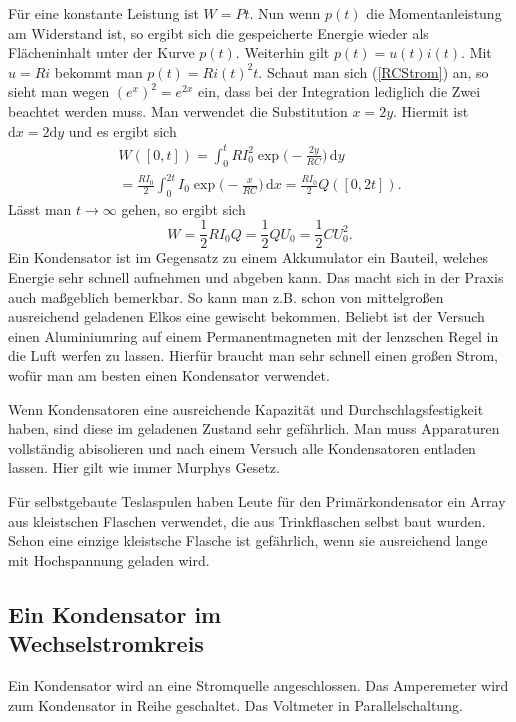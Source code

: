 \documentclass[a4paper,10pt,fleqn,twocolumn,twoside]{article}
\numberwithin{equation}{section}
\begin{document}
Für eine konstante Leistung ist $W=Pt$. Nun wenn $p(t)$ die
Momentanleistung am Widerstand ist, so ergibt sich die gespeicherte
Energie wieder als Flächeninhalt unter der Kurve $p(t)$.
Weiterhin gilt $p(t)=u(t)i(t)$. Mit $u=Ri$ bekommt man
$p(t)=Ri(t)^2 t$. Schaut man sich (\ref{RCStrom}) an, so sieht man
wegen $(e^x)^2=e^{2x}$ ein, dass bei der Integration lediglich
die Zwei beachtet werden muss. Man verwendet die Substitution
$x=2y$. Hiermit ist $\mathrm dx=2\mathrm dy$ und es ergibt sich
\begin{gather*}
W([0,t]) = \int_0^t RI_0^2 \exp\Big(-\frac{2y}{RC}\Big)\,\mathrm dy\\
= \frac{RI_0}{2}\int_0^{2t} I_0 \exp\Big(-\frac{x}{RC}\Big)\,\mathrm dx
= \frac{RI_0}{2}Q([0,2t]).
\end{gather*}
Lässt man $t\rightarrow\infty$ gehen, so ergibt sich
\begin{equation}
W = \frac{1}{2}RI_0Q = \frac{1}{2}QU_0 = \frac{1}{2}CU_0^2.
\end{equation}
Ein Kondensator ist im Gegensatz zu einem Akkumulator ein Bauteil,
welches Energie sehr schnell aufnehmen und abgeben kann. Das macht
sich in der Praxis auch maßgeblich bemerkbar. So kann man z.B. schon
von mittelgroßen ausreichend geladenen Elkos eine gewischt bekommen.
Beliebt ist der Versuch einen Aluminiumring auf einem
Permanentmagneten mit der lenzschen Regel in die Luft werfen zu
lassen. Hierfür braucht man sehr schnell einen großen Strom, wofür
man am besten einen Kondensator verwendet.

Wenn Kondensatoren eine ausreichende Kapazität und
Durchschlagsfestigkeit haben, sind diese im geladenen Zustand
sehr gefährlich. Man muss Apparaturen vollständig abisolieren
und nach einem Versuch alle Kondensatoren entladen lassen.
Hier gilt wie immer Murphys Gesetz.

Für selbstgebaute Teslaspulen haben Leute für den Primärkondensator
ein Array aus kleistschen Flaschen verwendet, die aus Trinkflaschen
selbst baut wurden. Schon eine einzige kleistsche Flasche ist
gefährlich, wenn sie ausreichend lange mit Hochspannung geladen wird.


\subsection[Ein Kondensator im Wechselstromkreis]
{Ein Kondensator im\\
Wechselstromkreis}

Ein Kondensator wird an eine Stromquelle angeschlossen.
Das Amperemeter wird zum Kondensator in Reihe geschaltet.
Das Voltmeter in Parallelschaltung.
\end{document}
